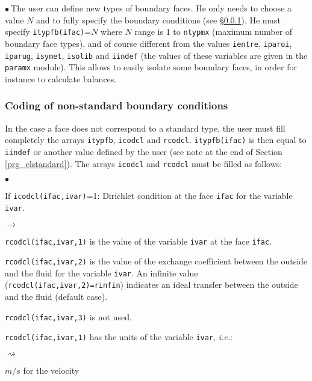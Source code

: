 {{{\noindent
$\bullet\ $The user can define new types of boundary faces. He only needs to
choose a value $N$ and to fully specify the boundary conditions (see
\S\ref{prg_clnonstandard}). He must specify
\texttt{itypfb(ifac)}=$N$ where $N$ range is 1 to
\texttt{ntypmx} (maximum number of boundary face types), and of
course different from the values \texttt{ientre}, \texttt{iparoi},
\texttt{iparug}, \texttt{isymet}, \texttt{isolib} and \texttt{iindef} (the values
of these variables are given in the \texttt{paramx} module). This allows to
easily isolate some boundary faces, in order for instance to calculate balances.

\subsubsection{Coding of non-standard boundary conditions}
\label{prg_clnonstandard}%
In the case a face does not correspond to a standard type, the user
must fill completely the arrays \texttt{itypfb}, \texttt{icodcl} and
\texttt{rcodcl}. \texttt{itypfb(ifac)} is then equal to \texttt{iindef}
or another value defined by the user (see note at the end of Section
\ref{prg_clstandard}). The arrays \texttt{icodcl} and \texttt{rcodcl}
must be filled as follows:

\begin{list}{$\bullet$}{}
\item If \texttt{icodcl(ifac,ivar)}=1: Dirichlet condition at the face
      \texttt{ifac} for the variable \texttt{ivar}.

\begin{list}{$\rightarrow$}{}
\item \texttt{rcodcl(ifac,ivar,1)} is the value of the variable \texttt{ivar}
      at the face \texttt{ifac}.

\item \texttt{rcodcl(ifac,ivar,2)} is the value of the exchange coefficient
      between the outside and the fluid for the variable \texttt{ivar}. An
      infinite value (\texttt{rcodcl(ifac,ivar,2)=rinfin}) indicates an
      ideal transfer between the outside and the fluid (default case).

\item \texttt{rcodcl(ifac,ivar,3)} is not used.

\item \texttt{rcodcl(ifac,ivar,1)} has the units of the variable
      \texttt{ivar}, {\em i.e.}:
\begin{list}{$\rightsquigarrow$}{}
\item $m/s$ for the velocity


\end{list}
\end{list}
\end{list}}}}
